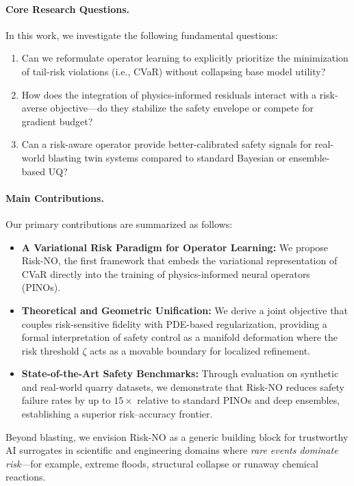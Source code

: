 \documentclass{article}
\theoremstyle{plain}
\theoremstyle{definition}
\theoremstyle{remark}
\begin{document}
\paragraph{Core Research Questions.}
In this work, we investigate the following fundamental questions:
\begin{enumerate}[leftmargin=1.5em, itemsep=0pt]
    \item Can we reformulate operator learning to explicitly prioritize the minimization of tail-risk violations (i.e., CVaR) without collapsing base model utility?
    \item How does the integration of physics-informed residuals interact with a risk-averse objective---do they stabilize the safety envelope or compete for gradient budget?
    \item Can a risk-aware operator provide better-calibrated safety signals for real-world blasting twin systems compared to standard Bayesian or ensemble-based UQ?
\end{enumerate}

\paragraph{Main Contributions.}
Our primary contributions are summarized as follows:
\begin{itemize}[leftmargin=1.5em, itemsep=0pt]
    \item \textbf{A Variational Risk Paradigm for Operator Learning:} We propose Risk-NO, the first framework that embeds the variational representation of CVaR directly into the training of physics-informed neural operators (PINOs).
    \item \textbf{Theoretical and Geometric Unification:} We derive a joint objective that couples risk-sensitive fidelity with PDE-based regularization, providing a formal interpretation of safety control as a manifold deformation where the risk threshold $\zeta$ acts as a movable boundary for localized refinement.
    \item \textbf{State-of-the-Art Safety Benchmarks:} Through evaluation on synthetic and real-world quarry datasets, we demonstrate that Risk-NO reduces safety failure rates by up to $15\times$ relative to standard PINOs and deep ensembles, establishing a superior risk--accuracy frontier.
\end{itemize}

Beyond blasting, we envision Risk-NO as a generic building block for trustworthy AI surrogates in scientific and engineering domains where \emph{rare events dominate risk}---for example, extreme floods, structural collapse or runaway chemical reactions.
\end{document}
